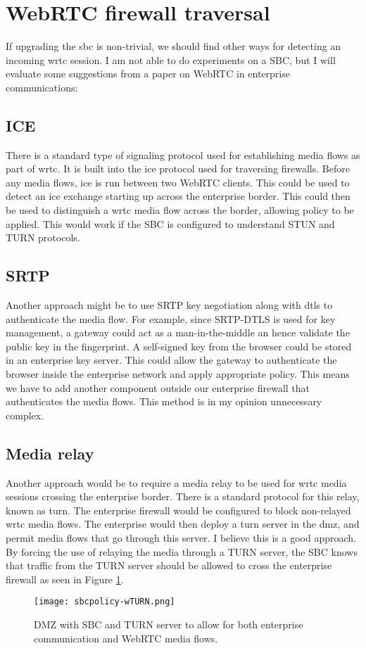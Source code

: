 \section{WebRTC firewall traversal}
If upgrading the \gls{sbc} is non-trivial, we should find other ways for detecting an incoming \gls{wrtc} session. I am not able to do experiments on a SBC, but I will evaluate some suggestions from a paper on WebRTC in enterprise communications\cite{johnston_taking_2013}:

\subsection{ICE}
There is a standard type of signaling protocol used for establishing media flows as part of \gls{wrtc}. It is built into the \gls{ice} protocol used for traversing firewalls. Before any media flows, \gls{ice} is run between two WebRTC clients. This could be used to detect an \gls{ice} exchange starting up across the enterprise border. This could then be used to distinguish a \gls{wrtc} media flow across the border, allowing policy to be applied\cite{johnston_taking_2013}. This would work if the SBC is configured to understand STUN and TURN protocols.

\subsection{SRTP}
Another approach might be to use SRTP key negotiation along with \gls{dtls} to authenticate the media flow. For example, since SRTP-DTLS is used for key management, a gateway could act as a man-in-the-middle an hence validate the public key in the fingerprint. A self-signed key from the browser could be stored in an enterprise key server. This could allow the gateway to authenticate the browser inside the enterprise network and apply appropriate policy\cite{johnston_taking_2013}. This means we have to add another component outside our enterprise firewall that authenticates the media flows. This method is in my opinion unnecessary complex.

\subsection{Media relay}
Another approach would be to require a media relay to be used for \gls{wrtc} media sessions crossing the enterprise border. There is a standard protocol for this relay, known as \gls{turn}. The enterprise firewall would be configured to block non-relayed \gls{wrtc} media flows. The enterprise would then deploy a \gls{turn} server in the \gls{dmz}, and permit media flows that go through this server\cite{johnston_taking_2013}. I believe this is a good approach. By forcing the use of relaying the media through a TURN server, the SBC knows that traffic from the TURN server should be allowed to cross the enterprise firewall as seen in Figure \ref{fig:sbc-turn}.
\\
\begin{figure}[here]
\centerline{\texttt{[image: sbcpolicy-wTURN.png]}}
\caption{DMZ with SBC and TURN server to allow for both enterprise communication and WebRTC media flows.}
\label{fig:sbc-turn}
\end{figure}

